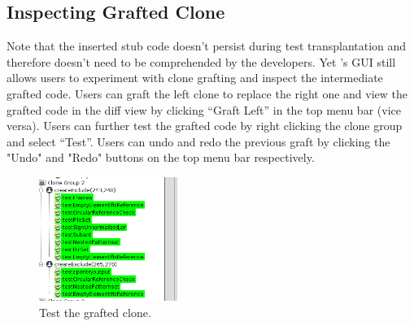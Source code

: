 \subsection{Inspecting Grafted Clone} 

Note that the inserted stub code doesn't persist during test transplantation and therefore doesn't need to be comprehended by the developers. Yet {\grafter}'s GUI still allows users to experiment with clone grafting and inspect the intermediate grafted code. Users can graft the left clone to replace the right one and view the grafted code in the diff view by clicking ``Graft Left'' in the top menu bar (vice versa). Users can further test the grafted code by right clicking the clone group and select ``Test''. Users can undo and redo the previous graft by clicking the "Undo" and "Redo" buttons on the top menu bar respectively.

\begin{figure}[!t]
\centering
\includegraphics[width=0.4\textwidth]{test-grafted-clone.png}
\caption{Test the grafted clone.}
\label{fig:hover}
\end{figure}